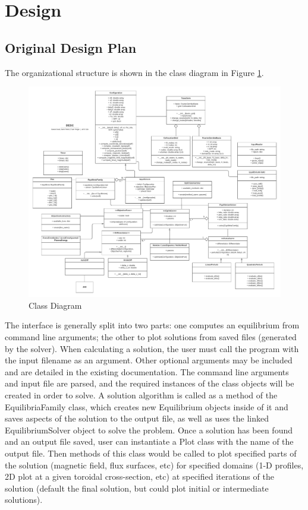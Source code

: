 \documentclass{article}
\begin{document}
\section{Design}

\subsection{Original Design Plan}

The organizational structure is shown in the class diagram in Figure \ref{fig:uml}.
%
\begin{figure}[H]
  \centering
  \includegraphics[width=1.6\linewidth,center]{./figs/UML_06.pdf}
  \caption{Class Diagram}
  \label{fig:uml}
\end{figure}

The interface is generally split into two parts: one computes an equilibrium from command line arguments; the other to plot solutions from saved files (generated by the solver).
When calculating a solution, the user must call the program with the input filename as an argument. Other optional arguments may be included and are detailed in the existing documentation.
The command line arguments and input file are parsed, and the required instances of the class objects will be created in order to solve.
A solution algorithm is called as a method of the EquilibriaFamily class, which creates new Equilibrium objects inside of it and saves aspects of the solution to the output file, as well as uses the linked EquilibriumSolver object to solve the problem.
Once a solution has been found and an output file saved, user can instantiate a Plot class with the name of the output file.
Then methods of this class would be called to plot specified parts of the solution (magnetic field, flux surfaces, etc) for specified domains (1-D profiles, 2D plot at a given toroidal cross-section, etc) at specified iterations of the solution (default the final solution, but could plot initial or intermediate solutions).
\end{document}
